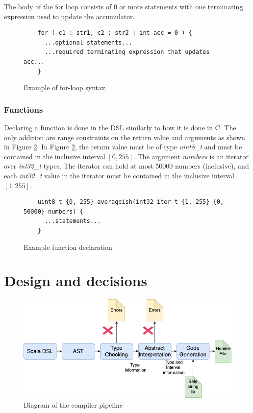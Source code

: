\documentclass[letterpaper]{article}
\begin{document}
The body of the for loop consists of 0 or more statements with one terminating
expression used to update the accumulator.

\begin{figure}[h]
\centering
\begin{lstlisting}
    for ( c1 : str1, c2 : str2 | int acc = 0 ) {
      ...optional statements...
      ...required terminating expression that updates acc...
    }
\end{lstlisting}
\caption{Example of for-loop syntax}
\label{fig:forloopsyntax}
\end{figure}

\subsubsection{Functions}

Declaring a function is done in the DSL similarly to how it is done in C.
The only addition are range constraints on the return value and arguments
as shown in Figure \ref{fig:functionsyntax}. In Figure \ref{fig:functionsyntax},
the return value must be of type \textit{uint8\_t} and must be contained in
the inclusive interval $[0, 255]$. The argument \textit{numbers} is an iterator
over \textit{int32\_t} types. The iterator can hold at most 50000 numbers (inclusive),
and each \textit{int32\_t} value in the iterator must be contained in the
inclusive interval $[1, 255]$.

\begin{figure}[h]
\centering
\begin{lstlisting}
    uint8_t {0, 255} averageish(int32_iter_t {1, 255} {0, 50000} numbers) {
      ...statements...
    }
\end{lstlisting}
\caption{Example function declaration}
\label{fig:functionsyntax}
\end{figure}

\section{Design and decisions}
\label{sec:design}

\begin{figure}[h]
  \centering
  \includegraphics[width=\textwidth]{architecture.png}
  \caption{Diagram of the compiler pipeline}
  \label{fig:pipeline}
\end{figure}
\end{document}
